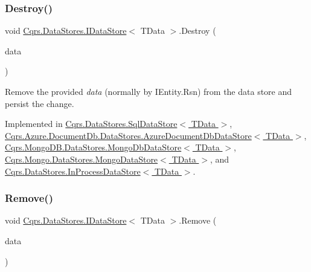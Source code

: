\subsubsection{\texorpdfstring{Destroy()}{Destroy()}}
{\footnotesize\ttfamily void \hyperlink{interfaceCqrs_1_1DataStores_1_1IDataStore}{Cqrs.\+Data\+Stores.\+I\+Data\+Store}$<$ T\+Data $>$.Destroy (\begin{DoxyParamCaption}\item[{T\+Data}]{data }\end{DoxyParamCaption})}



Remove the provided {\itshape data}  (normally by I\+Entity.\+Rsn) from the data store and persist the change. 



Implemented in \hyperlink{classCqrs_1_1DataStores_1_1SqlDataStore_a5ec396c9eb202c8de931c1546c721ca3_a5ec396c9eb202c8de931c1546c721ca3}{Cqrs.\+Data\+Stores.\+Sql\+Data\+Store$<$ T\+Data $>$}, \hyperlink{classCqrs_1_1Azure_1_1DocumentDb_1_1DataStores_1_1AzureDocumentDbDataStore_affe39fe57e590555256258fa6c568c29_affe39fe57e590555256258fa6c568c29}{Cqrs.\+Azure.\+Document\+Db.\+Data\+Stores.\+Azure\+Document\+Db\+Data\+Store$<$ T\+Data $>$}, \hyperlink{classCqrs_1_1MongoDB_1_1DataStores_1_1MongoDbDataStore_a4650c780f34e320ba39f312e3b04555d_a4650c780f34e320ba39f312e3b04555d}{Cqrs.\+Mongo\+D\+B.\+Data\+Stores.\+Mongo\+Db\+Data\+Store$<$ T\+Data $>$}, \hyperlink{classCqrs_1_1Mongo_1_1DataStores_1_1MongoDataStore_af97319aef1f0484666d9ea12578b8df9_af97319aef1f0484666d9ea12578b8df9}{Cqrs.\+Mongo.\+Data\+Stores.\+Mongo\+Data\+Store$<$ T\+Data $>$}, and \hyperlink{classCqrs_1_1DataStores_1_1InProcessDataStore_a1fc7a3935f52087f3703b652e77f0b75_a1fc7a3935f52087f3703b652e77f0b75}{Cqrs.\+Data\+Stores.\+In\+Process\+Data\+Store$<$ T\+Data $>$}.

\mbox{\label{interfaceCqrs_1_1DataStores_1_1IDataStore_a7ef540796bbe4257296841590bc23478_a7ef540796bbe4257296841590bc23478}} 
\subsubsection{\texorpdfstring{Remove()}{Remove()}}
{\footnotesize\ttfamily void \hyperlink{interfaceCqrs_1_1DataStores_1_1IDataStore}{Cqrs.\+Data\+Stores.\+I\+Data\+Store}$<$ T\+Data $>$.Remove (\begin{DoxyParamCaption}\item[{T\+Data}]{data }\end{DoxyParamCaption})}



